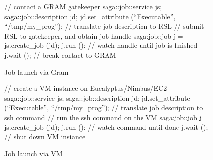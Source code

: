 \documentclass[conference,final]{IEEEtran}
\newcommand{\tc }{ $T_c$ }
\newcommand{\upp}{\vspace*{-0.5em}}
\begin{document}
\begin{figure}[!ht]
\upp 
 \begin{center}
  \begin{mycode}[label=SAGA Job Launch via GRAM gatekeeper]
  { // contact a GRAM gatekeeper
    saga::job::service     js;
    saga::job::description jd;
    jd.set_attribute (``Executable'', ``/tmp/my_prog'');
    // translate job description to RSL
    // submit RSL to gatekeeper, and obtain job handle
    saga:job::job j = js.create_job (jd);
    j.run ():
    // watch handle until job is finished
    j.wait ();
   } // break contact to GRAM
  \end{mycode}
  \caption{\label{gramjob}Job launch via Gram }
 \end{center}
\upp
\end{figure}

\begin{figure}[!ht]
\upp
 \begin{center}
  \begin{mycode}[label=SAGA create a VM instance on a Cloud]
   {// create a VM instance on Eucalyptus/Nimbus/EC2
    saga::job::service     js;
    saga::job::description jd;
    jd.set_attribute (``Executable'', ``/tmp/my_prog'');
    // translate job description to ssh command
    // run the ssh command on the VM
    saga:job::job j = js.create_job (jd);
    j.run ():
    // watch command until done
    j.wait ();
   } // shut down VM instance
  \end{mycode}
  \caption{\label{vmjob} Job launch via VM}
 \end{center}
\upp
\end{figure}

\end{document}
